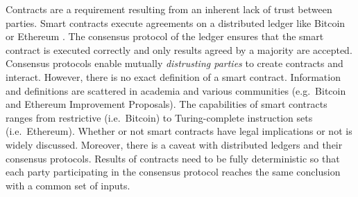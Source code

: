 Contracts are a requirement resulting from an inherent lack of trust between parties.
Smart contracts execute agreements on a distributed ledger like Bitcoin or Ethereum \cite{Nakamoto2008,Buterin2013}.
The consensus protocol of the ledger ensures that the smart contract is executed correctly and only results agreed by a majority are accepted.
Consensus protocols enable mutually \emph{distrusting parties} to create contracts and interact.
However, there is no exact definition of a smart contract.
Information and definitions are scattered in academia and various communities (e.g.\ Bitcoin and Ethereum Improvement Proposals).
The capabilities of smart contracts ranges from restrictive (i.e.\ Bitcoin) to Turing-complete instruction sets (i.e.\ Ethereum). 
Whether or not smart contracts have legal implications or not is widely discussed.
Moreover, there is a caveat with distributed ledgers and their consensus protocols.
Results of contracts need to be fully deterministic so that each party participating in the consensus protocol reaches the same conclusion with a common set of inputs.

